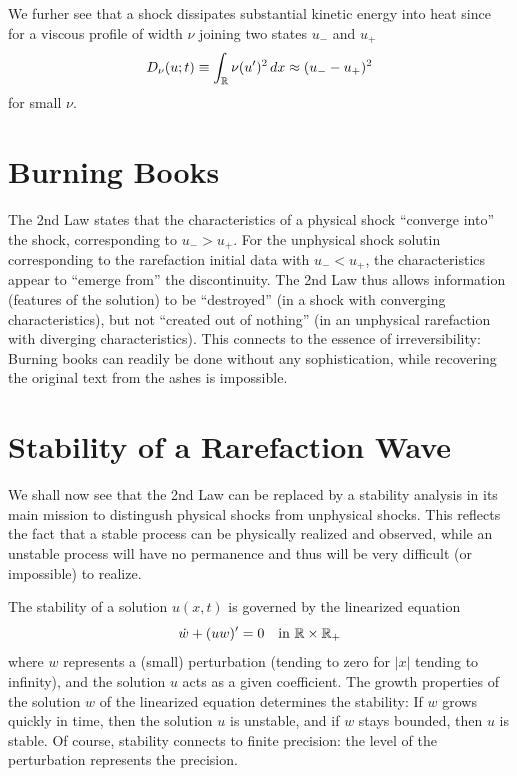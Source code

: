 We furher see that a shock dissipates substantial
kinetic energy into heat since for a viscous profile of width
$\nu$ joining two states $u_-$ and $u_+$   
\begin{equation}\label{Djump}
D_\nu (u;t)\equiv \int_{\mathbb{R}}\nu (u^\prime )^2\, dx\approx (u_--u_+)^2
\end{equation}
for small $\nu$.


\section{Burning Books}

The 2nd Law states that the characteristics of 
a physical shock  ``converge into'' the shock, corresponding
to $u_->u_+$. For the unphysical shock solutin
corresponding to the rarefaction
initial data with $u_-<u_+$, the characteristics
appear to ``emerge from'' the discontinuity. The
2nd Law thus allows information (features of the solution) to 
be ``destroyed'' (in a shock with converging characteristics), 
but not ``created out of nothing'' 
(in an unphysical rarefaction with diverging characteristics).
This connects to the essence of irreversibility: Burning books
can readily be done without any sophistication, while recovering the
original text from the ashes is impossible.  

\section{Stability of a Rarefaction Wave}

We shall now see that the 2nd Law can be replaced by a stability analysis
in its main mission to distingush physical shocks from unphysical shocks.
This reflects the fact that a stable process can be physically realized 
and observed, while an unstable process will have no permanence and
thus will be very difficult (or impossible) to realize.

The stability of a solution $u(x,t)$ is governed 
by the linearized equation 
\begin{equation}\label{linburgers}
\dot w+(uw)^\prime =0\quad\mbox{in }{\mathbb{R}}\times{\mathbb{R}}_+
\end{equation}
where $w$ represents a (small) perturbation (tending to zero for $\vert x\vert$
tending to infinity), and the solution $u$ acts as a 
given coefficient. The growth properties of the solution
$w$ of the linearized equation determines the stability:
If $w$ grows quickly in time, then the solution $u$ is unstable,
and if $w$ stays bounded, then $u$ is stable. Of course, stability
connects to finite precision: the level of the perturbation 
represents the precision.

